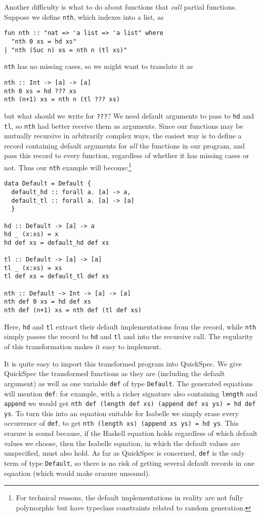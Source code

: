 Another difficulty is what to do about functions that \emph{call} partial functions.
Suppose we define \verb|nth|, which indexes into a list, as
\begin{verbatim}
fun nth :: "nat => 'a list => 'a list" where
  "nth 0 xs = hd xs"
| "nth (Suc n) xs = nth n (tl xs)"
\end{verbatim}

\verb|nth| has no missing cases, so we might want to translate it as
\begin{verbatim}
nth :: Int -> [a] -> [a]
nth 0 xs = hd ??? xs
nth (n+1) xs = nth n (tl ??? xs)
\end{verbatim}
but what should we write for \verb|???|? We need default arguments to
pass to \verb|hd| and \verb|tl|, so \verb|nth| had better receive
them as arguments. Since our functions may be mutually recursive in
arbitrarily complex ways, the easiest way is to define a record
containing default arguments for \emph{all} the functions in our
program, and pass this record to every function, regardless of whether
it has missing cases or not. Thus our \verb|nth| example will become:\footnote{For
technical reasons, the default implementations in reality are not fully
polymorphic but have typeclass constraints related to random generation.}
\begin{verbatim}
data Default = Default {
  default_hd :: forall a. [a] -> a,
  default_tl :: forall a. [a] -> [a]
  }

hd :: Default -> [a] -> a
hd _ (x:xs) = x
hd def xs = default_hd def xs

tl :: Default -> [a] -> [a]
tl _ (x:xs) = xs
tl def xs = default_tl def xs

nth :: Default -> Int -> [a] -> [a]
nth def 0 xs = hd def xs
nth def (n+1) xs = nth def (tl def xs)
\end{verbatim}
Here, \verb|hd| and \verb|tl| extract their default implementations
from the record, while \verb|nth| simply passes the record to \verb|hd|
and \verb|tl| and into the recursive call. The regularity of this
transformation makes it easy to implement.

It is quite easy to import this transformed program into QuickSpec.
We give QuickSpec the transformed functions as they are (including the
default argument) as well as one variable \verb|def| of
type \verb|Default|. The generated equations will mention \verb|def|:
for example, with a richer signature also containing
\verb|length| and \verb|append| we would get
\verb|nth def (length def xs) (append def xs ys) = hd def ys|.
To turn this into an equation suitable for Isabelle we simply erase
every occurrence of \verb|def|, to get
\verb|nth (length xs) (append xs ys) = hd ys|.
This erasure is sound because, if the Haskell equation holds
regardless of which default values we choose, then the Isabelle
equation, in which the default values are unspecified, must also hold.
As far as QuickSpec is concerned, \verb|def| is the only term of type
\verb|Default|, so there is no risk of getting several default records
in one equation (which would make erasure unsound).
